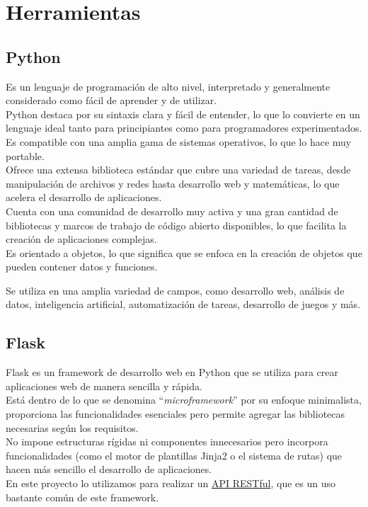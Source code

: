 \section{Herramientas}

\subsection{Python~\cite{lutz2001programming}}
Es un lenguaje de programación de alto nivel, interpretado y generalmente 
considerado como fácil de aprender y de utilizar. \\
Python destaca por su sintaxis clara y fácil de entender, 
lo que lo convierte en un lenguaje ideal tanto para principiantes 
como para programadores experimentados.\\
Es compatible con una amplia gama de sistemas operativos, 
lo que lo hace muy portable.\\

Ofrece una extensa biblioteca estándar que cubre una variedad de tareas, 
desde manipulación de archivos y redes hasta desarrollo web y 
matemáticas, lo que acelera el desarrollo de aplicaciones.\\
Cuenta con una comunidad de desarrollo muy activa y 
una gran cantidad de bibliotecas y marcos de trabajo de código abierto disponibles, 
lo que facilita la creación de aplicaciones complejas.\\
Es orientado a objetos, lo que significa que se enfoca en la creación de objetos 
que pueden contener datos y funciones.

Se utiliza en una amplia variedad de campos, como desarrollo web, 
análisis de datos, inteligencia artificial, automatización de tareas, desarrollo de juegos y más.

\subsection{Flask~\cite{dwyer2017flask}}
Flask es un framework de desarrollo web en Python que se utiliza 
para crear aplicaciones web de manera sencilla y rápida. \\
Está dentro de lo que se denomina ``\emph{microframework}'' por su enfoque minimalista, proporciona 
las funcionalidades esenciales pero permite agregar las bibliotecas necesarias según los requisitos.\\
No impone estructuras rígidas ni componentes innecesarios pero incorpora funcionalidades 
(como el motor de plantillas Jinja2 o el sistema de rutas) que hacen 
más sencillo el desarrollo de aplicaciones. \\
En este proyecto lo utilizamos para realizar un \href{https://aws.amazon.com/es/what-is/restful-api}{API RESTful}, que es un uso bastante común de este framework.


